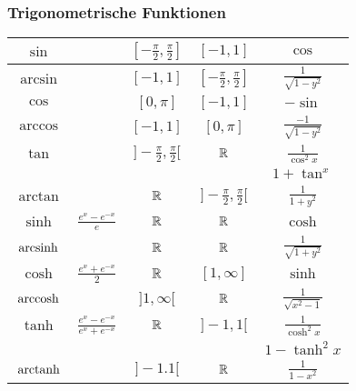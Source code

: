 \subsubsection{Trigonometrische Funktionen}
\begin{tabular}{c | c | c | c | c}
    $\sin$       &                                   & $[-\frac{\pi}{2}, \frac{\pi}{2}]$ & $[-1, 1]$                          & $\cos$\\\hline
    $\arcsin$    &                                   & $[-1, 1]$                         & $[-\frac{\pi}{2}, \frac{\pi}{2}]$  & $\frac{1}{\sqrt{1-y^2} }$\\\hline
    $\cos$       &                                   & $[0, \pi]$                        & $[-1, 1]$                          & $-\sin$\\\hline
    $\arccos$    &                                   & $[-1, 1]$                         & $[0, \pi]$                         & $\frac{-1}{\sqrt{1-y^2} }$\\\hline
    $\tan$       &                                   & $]-\frac{\pi}{2}, \frac{\pi}{2}[$ & $ \mathbb{R}$                              & $\frac{1}{\cos^2x}$\\
                 &                                   &                                   &                                    & $1 + \tan^x$\\\hline
    $\arctan$    &                                   & $ \mathbb{R}$                             & $]- \frac{\pi}{2}, \frac{\pi}{2}[$ & $\frac{1}{1+y^2}$\\\hline
    $\sinh$      & $\frac{e^x - e^{-x}}{e}$          & $\mathbb{R}$                              & $\mathbb{R}$                               & $\cosh$\\\hline
    $\operatorname{arcsinh}$   &                       & $\mathbb{R}$                              & $\mathbb{R}$                               & $\frac{1}{\sqrt{1+y^2} }$\\\hline
    $\cosh$      & $\frac{e^x+e^{-x}}{2}$            & $\mathbb{R}$                              & $[1,\infty]$                       & $\sinh$\\\hline
    $\operatorname{arccosh}$ & & $]1,\infty[$ & $\mathbb{R}$ & $\frac{1}{\sqrt{x^2-1}}$\\\hline
    $\tanh$      & $\frac{e^x-e^{-x}}{e^x + e^{-x}}$ & $\mathbb{R}$                              & $]-1,1[$                           & $\frac{1}{\cosh^2x}$\\
                 &                                   &                                   &                                    & $1 - \tanh^2x$\\\hline
    $\operatorname{arctanh}$ & & $]-1.1[$ & $\mathbb{R}$ & $\frac{1}{1-x^2}$\\\hline
\end{tabular}

